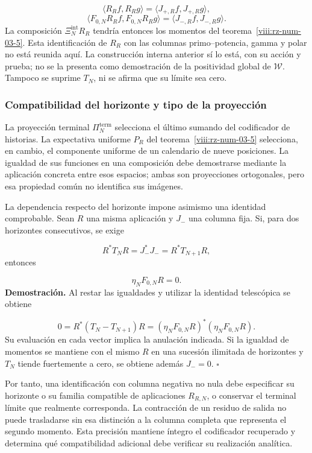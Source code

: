 \[
\langle R_Rf,R_Rg\rangle
=\langle J_{+,R}f,J_{+,R}g\rangle,
\]
\[
\langle F_{0,N}R_Rf,F_{0,N}R_Rg\rangle
=\langle J_{-,R}f,J_{-,R}g\rangle.
\]
La composición \(\Xi_N^{\mathrm{int}}R_R\) tendría entonces los momentos del teorema~\ref{viii:rz-num-03-5}. Esta identificación de \(R_R\) con las columnas primo–potencia, gamma y polar no está reunida aquí. La construcción interna anterior sí lo está, con su acción y prueba; no se la presenta como demostración de la positividad global de \(\mathscr W\). Tampoco se suprime \(T_N\), ni se afirma que su límite sea cero.

\subsubsection*{Compatibilidad del horizonte y tipo de la proyección}
La proyección terminal \(\Pi_N^{\mathrm{term}}\) selecciona el último sumando del codificador de historias. La expectativa uniforme \(P_R\) del teorema~\ref{viii:rz-num-03-5} selecciona, en cambio, el componente uniforme de un calendario de nueve posiciones. La igualdad de sus funciones en una composición debe demostrarse mediante la aplicación concreta entre esos espacios; ambas son proyecciones ortogonales, pero esa propiedad común no identifica sus imágenes.

La dependencia respecto del horizonte impone asimismo una identidad comprobable. Sean \(R\) una misma aplicación y \(J_-\) una columna fija. Si, para dos horizontes consecutivos, se exige

\[
R^*T_NR=J_-^*J_-=R^*T_{N+1}R,
\]
entonces

\[
\eta_NF_{0,N}R=0.
\]
\textbf{Demostración.} Al restar las igualdades y utilizar la identidad telescópica se obtiene

\[
0=R^*(T_N-T_{N+1})R
=(\eta_NF_{0,N}R)^*(\eta_NF_{0,N}R).
\]
Su evaluación en cada vector implica la anulación indicada. Si la igualdad de momentos se mantiene con el mismo \(R\) en una sucesión ilimitada de horizontes y \(T_N\) tiende fuertemente a cero, se obtiene además \(J_-=0\). \hfill\(\square\)

Por tanto, una identificación con columna negativa no nula debe especificar su horizonte o su familia compatible de aplicaciones \(R_{R,N}\), o conservar el terminal límite que realmente corresponda. La contracción de un residuo de salida no puede trasladarse sin esa distinción a la columna completa que representa el segundo momento. Esta precisión mantiene íntegro el codificador recuperado y determina qué compatibilidad adicional debe verificar su realización analítica.

